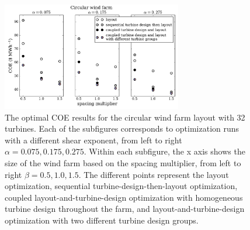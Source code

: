 \begin{figure}[htbp]
  \centering
  \includegraphics[width=0.7\textwidth]{Figures/circular_results1.pdf}
  \caption{\label{circular_results} The optimal COE results for the circular wind farm layout with 32 turbines. Each of the subfigures corresponds to optimization runs with a different shear exponent, from left to right $\alpha=0.075,0.175,0.275$. Within each subfigure, the x axis shows the size of the wind farm based on the spacing multiplier, from left to right $\beta=0.5,1.0,1.5$. The different points represent the layout optimization, sequential turbine-design-then-layout optimization, coupled layout-and-turbine-design optimization with homogeneous turbine design throughout the farm, and layout-and-turbine-design optimization with two different turbine design groups.}
\end{figure}



